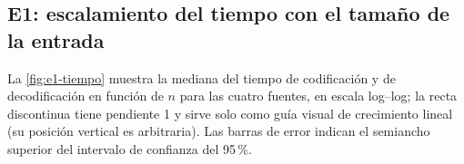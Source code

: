 \newcommand{\graficoBpbN}[2]{%
  \begin{tikzpicture}
    \begin{semilogxaxis}[informe, height=0.78\linewidth, log basis x=2,
        xlabel={$n$ [bytes]}, ylabel={bits por byte}, ymin=0,
        title={#2}, title style={font=\small\bfseries},
        legend to name=leyendaBpbN-#1, legend columns=4,
        legend style={draw=gray!50, /tikz/every even column/.append style={column sep=6pt}}]
      \addplot[black!70, mark=*, mark size=1.2pt] table[col sep=comma, x=n, y=#1_bpb] {results/e1_uniform.csv};
      \addlegendentry{\texttt{uniform}}
      \addplot[blue!70!black, mark=square*, mark size=1.2pt] table[col sep=comma, x=n, y=#1_bpb] {results/e1_skewed.csv};
      \addlegendentry{\texttt{skewed}}
      \addplot[green!45!black, mark=triangle*, mark size=1.5pt] table[col sep=comma, x=n, y=#1_bpb] {results/e1_synthtext.csv};
      \addlegendentry{\texttt{synthtext}}
      \addplot[red!70!black, mark=diamond*, mark size=1.5pt] table[col sep=comma, x=n, y=#1_bpb] {results/e1_dickens.csv};
      \addlegendentry{\texttt{dickens}}
    \end{semilogxaxis}
  \end{tikzpicture}}

\subsection{E1: escalamiento del tiempo con el tamaño de la entrada}
\label{sec:res-e1}
La \cref{fig:e1-tiempo} muestra la mediana del tiempo de codificación y de decodificación en
función de $n$ para las cuatro fuentes, en escala log--log; la recta discontinua tiene
pendiente 1 y sirve solo como guía visual de crecimiento lineal (su posición vertical es
arbitraria). Las barras de error indican el semiancho superior del intervalo de confianza del
95\,\%.

